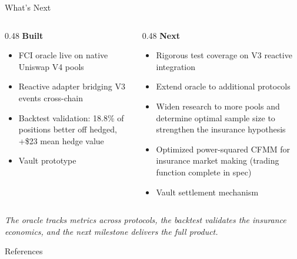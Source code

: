 \documentclass[aspectratio=169]{beamer}
\begin{document}
\begin{frame}{What's Next}

\begin{columns}[T]

\begin{column}{0.48\textwidth}
\textbf{Built}

\begin{itemize}\small
  \item FCI oracle live on native Uniswap V4 pools
  \item Reactive adapter bridging V3 events cross-chain
  \item Backtest validation: 18.8\% of positions better off hedged,
    +\$23 mean hedge value
  \item Vault prototype
\end{itemize}
\end{column}

\begin{column}{0.48\textwidth}
\textbf{Next}

\begin{itemize}\small
  \item Rigorous test coverage on V3 reactive integration
  \item Extend oracle to additional protocols
  \item Widen research to more pools and determine optimal
    sample size to strengthen the insurance hypothesis
  \item Optimized power-squared CFMM for insurance market making
    (trading function complete in spec)
  \item Vault settlement mechanism
\end{itemize}
\end{column}

\end{columns}

\bigskip

\begin{center}
{\small\textit{The oracle tracks metrics across protocols, the backtest validates
the insurance economics, and the next milestone delivers the full product.}}
\end{center}

\end{frame}

\begin{frame}[allowframebreaks]{References}
\footnotesize

\end{frame}

\end{document}
